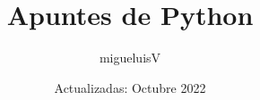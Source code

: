 \documentclass[12pt]{article}
\title{Apuntes de Python}
\author{migueluisV}
\date{Actualizadas: Octubre 2022}
\begin{document}
\renewcommand*\contentsname{Índice}
\renewcommand{\listtablename}{Índice de Tablas}

\maketitle\newpage
\tableofcontents\newpage
\listoftables\newpage







\end{document}
